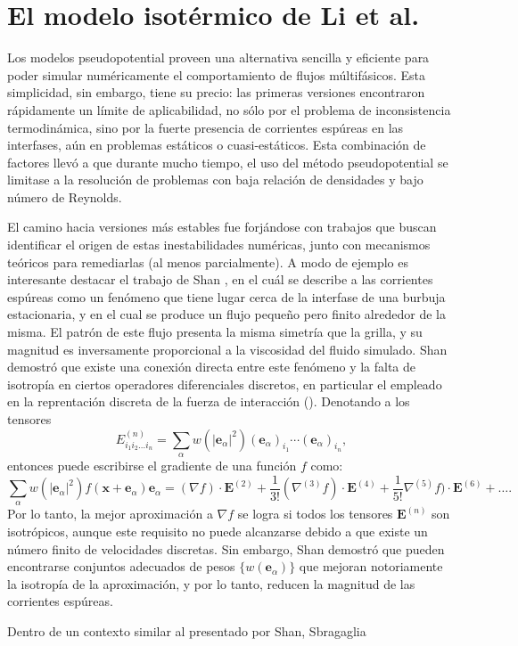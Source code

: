\section{El modelo isot\'ermico de Li et al.}

Los modelos pseudopotential proveen una alternativa sencilla y eficiente para poder simular num\'ericamente el comportamiento de flujos m\'ultif\'asicos. Esta simplicidad, sin embargo, tiene su precio: las primeras versiones encontraron r\'apidamente un l\'imite de aplicabilidad, no s\'olo por el problema de inconsistencia termodin\'amica, sino por la fuerte presencia de corrientes esp\'ureas en las interfases, a\'un en problemas est\'aticos o cuasi-est\'aticos. Esta combinaci\'on de factores llev\'o a que durante mucho tiempo, el uso del m\'etodo pseudopotential se limitase a la resoluci\'on de problemas con baja relaci\'on de densidades y bajo n\'umero de Reynolds.

El camino hacia versiones m\'as estables fue forj\'andose con trabajos que buscan identificar el origen de estas inestabilidades num\'ericas, junto con mecanismos te\'oricos para remediarlas (al menos parcialmente). A modo de ejemplo es interesante destacar el trabajo de Shan \cite{shan_analysis_2006}, en el cu\'al se describe a las corrientes esp\'ureas como un fen\'omeno que tiene lugar cerca de la interfase de una burbuja estacionaria, y en el cual se produce un flujo peque\~no pero finito alrededor de la misma. El patr\'on de este flujo presenta la misma simetr\'ia que la grilla, y su magnitud es inversamente proporcional a la viscosidad del fluido simulado. Shan demostr\'o que existe una conexi\'on directa entre este fen\'omeno y la falta de isotrop\'ia en ciertos operadores diferenciales discretos, en particular el empleado en la reprentaci\'on discreta de la fuerza de interacci\'on (). Denotando a los tensores 
\begin{equation}
	E^{(n)}_{i_1i_2\ldots i_n} = \sum_{\alpha}w(|\bm{e}_{\alpha}|^2)(\bm{e}_{\alpha})_{i_1} \cdots (\bm{e}_{\alpha})_{i_n},
\end{equation}
entonces puede escribirse el gradiente de una funci\'on $f$ como:
\begin{equation}
	\sum_{\alpha}w(|\bm{e}_{\alpha}|^2) f(\bm{x}+\bm{e}_{\alpha})\bm{e}_{\alpha}=(\nabla f)\cdot \bm{E}^{(2)} + \dfrac{1}{3!}(\nabla^{(3)} f)\cdot \bm{E}^{(4)} + \dfrac{1}{5!}\nabla^{(5)} f)\cdot \bm{E}^{(6)} + \ldots.
\end{equation}
Por lo tanto, la mejor aproximaci\'on a $\nabla f$ se logra si todos los tensores $\bm{E}^{(n)}$ son isotr\'opicos, aunque este requisito no puede alcanzarse debido a que existe un n\'umero finito de  velocidades discretas. Sin embargo, Shan demostr\'o que pueden encontrarse conjuntos adecuados de pesos $\{ w(\bm{e}_{\alpha})\}$ que mejoran notoriamente la isotrop\'ia de la aproximaci\'on, y por lo tanto, reducen la magnitud de las corrientes esp\'ureas.

Dentro de un contexto similar al presentado por Shan, Sbragaglia